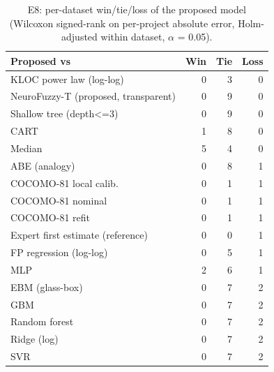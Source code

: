 \begin{table}[t]
\centering
\small
\caption{E8: per-dataset win/tie/loss of the proposed model (Wilcoxon signed-rank on per-project absolute error, Holm-adjusted within dataset, $\alpha$ = 0.05).}
\label{tab:e8-wtl}
\begin{tabular}{lrrr}
\toprule
Proposed vs & Win & Tie & Loss \\
\midrule
KLOC power law (log-log) & 0 & 3 & 0 \\
NeuroFuzzy-T (proposed, transparent) & 0 & 9 & 0 \\
Shallow tree (depth<=3) & 0 & 9 & 0 \\
CART & 1 & 8 & 0 \\
Median & 5 & 4 & 0 \\
ABE (analogy) & 0 & 8 & 1 \\
COCOMO-81 local calib. & 0 & 1 & 1 \\
COCOMO-81 nominal & 0 & 1 & 1 \\
COCOMO-81 refit & 0 & 1 & 1 \\
Expert first estimate (reference) & 0 & 0 & 1 \\
FP regression (log-log) & 0 & 5 & 1 \\
MLP & 2 & 6 & 1 \\
EBM (glass-box) & 0 & 7 & 2 \\
GBM & 0 & 7 & 2 \\
Random forest & 0 & 7 & 2 \\
Ridge (log) & 0 & 7 & 2 \\
SVR & 0 & 7 & 2 \\
\bottomrule
\end{tabular}
\end{table}
